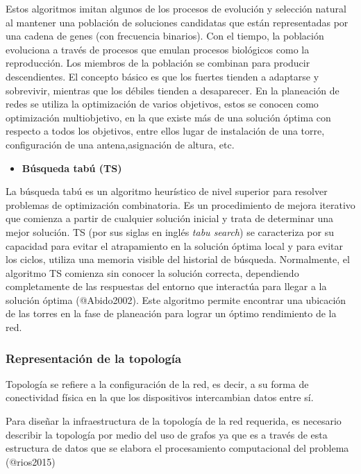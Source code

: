 \documentclass[]{article}
\providecommand{\tightlist}{%
  \setlength{\itemsep}{0pt}\setlength{\parskip}{0pt}}
\begin{document}
Estos algoritmos imitan algunos de los procesos de evolución y selección
natural al mantener una población de soluciones candidatas que están
representadas por una cadena de genes (con frecuencia binarios). Con el
tiempo, la población evoluciona a través de procesos que emulan procesos
biológicos como la reproducción. Los miembros de la población se
combinan para producir descendientes. El concepto básico es que los
fuertes tienden a adaptarse y sobrevivir, mientras que los débiles
tienden a desaparecer. En la planeación de redes se utiliza la
optimización de varios objetivos, estos se conocen como optimización
multiobjetivo, en la que existe más de una solución óptima con respecto
a todos los objetivos, entre ellos lugar de instalación de una torre,
configuración de una antena,asignación de altura, etc.

\begin{itemize}
\tightlist
\item
  \textbf{Búsqueda tabú (TS)}
\end{itemize}

La búsqueda tabú es un algoritmo heurístico de nivel superior para
resolver problemas de optimización combinatoria. Es un procedimiento de
mejora iterativo que comienza a partir de cualquier solución inicial y
trata de determinar una mejor solución. TS (por sus siglas en inglés
\emph{tabu search}) se caracteriza por su capacidad para evitar el
atrapamiento en la solución óptima local y para evitar los ciclos,
utiliza una memoria visible del historial de búsqueda. Normalmente, el
algoritmo TS comienza sin conocer la solución correcta, dependiendo
completamente de las respuestas del entorno que interactúa para llegar a
la solución óptima (@Abido2002). Este algoritmo permite encontrar una
ubicación de las torres en la fase de planeación para lograr un óptimo
rendimiento de la red.

\subsubsection{Representación de la
topología}\label{representaciuxf3n-de-la-topologuxeda}

Topología se refiere a la configuración de la red, es decir, a su forma
de conectividad física en la que los dispositivos intercambian datos
entre sí.

Para diseñar la infraestructura de la topología de la red requerida, es
necesario describir la topología por medio del uso de grafos ya que es a
través de esta estructura de datos que se elabora el procesamiento
computacional del problema (@rios2015)
\end{document}
